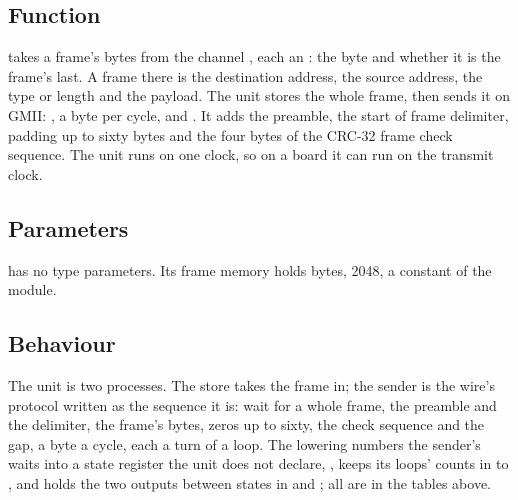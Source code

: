 
%
{}

\subsection*{Function}

 takes a frame's bytes from the channel , each an
: the byte and whether it is the frame's last. A frame
there is the destination address, the source address, the type or
length and the payload. The unit stores the whole frame, then sends it
on GMII: , a byte per cycle, and . It adds the
preamble, the start of frame delimiter, padding up to sixty bytes and
the four bytes of the CRC-32 frame check sequence. The unit runs on one
clock, so on a board it can run on the transmit clock.

\subsection*{Parameters}

 has no type parameters. Its frame memory holds
 bytes, 2048, a constant of the module.


\subsection*{Behaviour}

The unit is two processes. The store takes the frame in; the sender is
the wire's protocol written as the sequence it is: wait for a whole
frame, the preamble and the delimiter, the frame's bytes, zeros up to
sixty, the check sequence and the gap, a byte a cycle, each a turn of
a loop. The lowering numbers the sender's waits into a state register
the unit does not declare, , keeps its loops' counts in
 to , and holds the two outputs between states in
 and ; all are in the tables above.

